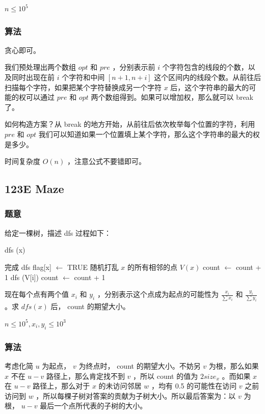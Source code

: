 \documentclass[11pt]{article}
\begin{document}
    $n \leq 10^5$
\subsubsection{算法}
\label{sec-8-5-2}

    贪心即可。

    我们预处理出两个数组 $opt$ 和 $pre$ ，分别表示前 $i$ 个字符包含的线段的个数，以及同时出现在前 $i$ 个字符和中间 $[n + 1, n + i]$ 这个区间内的线段个数。从前往后扫描每个字符，如果把某个字符替换成另一个字符 $x$ 后，这个字符串的最大的可能的权可以通过 $pre$ 和 $opt$ 两个数组得到。如果可以增加权，那么就可以 break 了。

    如何构造方案？从 break 的地方开始，从前往后依次枚举每个位置的字符，利用 $pre$ 和 $opt$ 我们可以知道如果一个位置填上某个字符，那么这个字符串的最大的权是多少。

    时间复杂度 $O(n)$ ，注意公式不要错即可。
\subsection{123E  Maze}
\label{sec-8-6}
\subsubsection{题意}
\label{sec-8-6-1}

    给定一棵树，描述 dfs 过程如下：
\begin{algorithm}
  \label{algo:123E-dfs}
  \caption{dfs (x)}
  \begin{algorithmic}
      \STATE 完成 dfs 
    \ENDIF
    \STATE flag[x] $\leftarrow$ TRUE
    \STATE 随机打乱 $x$ 的所有相邻的点 $V(x)$
         \STATE count $\leftarrow$ count + 1
         \STATE dfs (V[i])
      \ENDIF
    \ENDFOR
    \STATE count $\leftarrow$ count + 1
  \end{algorithmic}
\end{algorithm}
    现在每个点有两个值 $x_i$ 和 $y_i$ ，分别表示这个点成为起点的可能性为 $\frac{x_i}{\sum x_i}$ 和 $\frac{y_i}{\sum y_i}$ 。求 $dfs (x)$ 后， count 的期望大小。

    $n \leq 10^5, x_i, y_i \leq 10^3$
\subsubsection{算法}
\label{sec-8-6-2}

    考虑化简 $u$ 为起点， $v$ 为终点时， count 的期望大小。不妨另 $v$ 为根，那么如果 $x$ 不在 $u-v$ 路径上，那么肯定找不到 $v$ ，所以 count 的值为 $2 size_x$ 。而如果 $x$ 在 $u-v$ 路径上，那么对于 $x$ 的未访问邻居 $w$ ，均有 0.5 的可能性在访问 $v$ 之前访问到 $w$ ，所以每棵子树对答案的贡献为子树大小。所以最后答案为：以 $v$ 为根， $u-v$ 最后一个点所代表的子树的大小。
\end{document}
